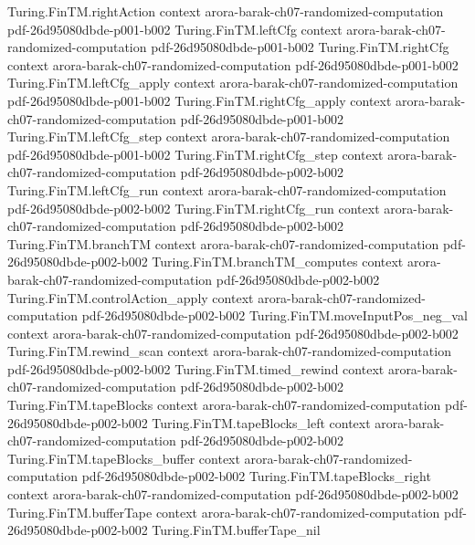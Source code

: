 \begin{theorem}
\proofstep
  {Turing.FinTM.rightAction}
  {context}
  {arora-barak-ch07-randomized-computation}
  {pdf-26d95080dbde-p001-b002}
\proofstep
  {Turing.FinTM.leftCfg}
  {context}
  {arora-barak-ch07-randomized-computation}
  {pdf-26d95080dbde-p001-b002}
\proofstep
  {Turing.FinTM.rightCfg}
  {context}
  {arora-barak-ch07-randomized-computation}
  {pdf-26d95080dbde-p001-b002}
\proofstep
  {Turing.FinTM.leftCfg_apply}
  {context}
  {arora-barak-ch07-randomized-computation}
  {pdf-26d95080dbde-p001-b002}
\proofstep
  {Turing.FinTM.rightCfg_apply}
  {context}
  {arora-barak-ch07-randomized-computation}
  {pdf-26d95080dbde-p001-b002}
\proofstep
  {Turing.FinTM.leftCfg_step}
  {context}
  {arora-barak-ch07-randomized-computation}
  {pdf-26d95080dbde-p001-b002}
\proofstep
  {Turing.FinTM.rightCfg_step}
  {context}
  {arora-barak-ch07-randomized-computation}
  {pdf-26d95080dbde-p002-b002}
\proofstep
  {Turing.FinTM.leftCfg_run}
  {context}
  {arora-barak-ch07-randomized-computation}
  {pdf-26d95080dbde-p002-b002}
\proofstep
  {Turing.FinTM.rightCfg_run}
  {context}
  {arora-barak-ch07-randomized-computation}
  {pdf-26d95080dbde-p002-b002}
\proofstep
  {Turing.FinTM.branchTM}
  {context}
  {arora-barak-ch07-randomized-computation}
  {pdf-26d95080dbde-p002-b002}
\proofstep
  {Turing.FinTM.branchTM_computes}
  {context}
  {arora-barak-ch07-randomized-computation}
  {pdf-26d95080dbde-p002-b002}
\proofstep
  {Turing.FinTM.controlAction_apply}
  {context}
  {arora-barak-ch07-randomized-computation}
  {pdf-26d95080dbde-p002-b002}
\proofstep
  {Turing.FinTM.moveInputPos_neg_val}
  {context}
  {arora-barak-ch07-randomized-computation}
  {pdf-26d95080dbde-p002-b002}
\proofstep
  {Turing.FinTM.rewind_scan}
  {context}
  {arora-barak-ch07-randomized-computation}
  {pdf-26d95080dbde-p002-b002}
\proofstep
  {Turing.FinTM.timed_rewind}
  {context}
  {arora-barak-ch07-randomized-computation}
  {pdf-26d95080dbde-p002-b002}
\proofstep
  {Turing.FinTM.tapeBlocks}
  {context}
  {arora-barak-ch07-randomized-computation}
  {pdf-26d95080dbde-p002-b002}
\proofstep
  {Turing.FinTM.tapeBlocks_left}
  {context}
  {arora-barak-ch07-randomized-computation}
  {pdf-26d95080dbde-p002-b002}
\proofstep
  {Turing.FinTM.tapeBlocks_buffer}
  {context}
  {arora-barak-ch07-randomized-computation}
  {pdf-26d95080dbde-p002-b002}
\proofstep
  {Turing.FinTM.tapeBlocks_right}
  {context}
  {arora-barak-ch07-randomized-computation}
  {pdf-26d95080dbde-p002-b002}
\proofstep
  {Turing.FinTM.bufferTape}
  {context}
  {arora-barak-ch07-randomized-computation}
  {pdf-26d95080dbde-p002-b002}
\proofstep
  {Turing.FinTM.bufferTape_nil}

\end{theorem}
